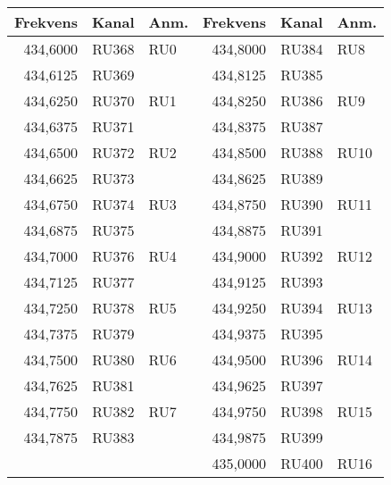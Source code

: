\clearpage
\begin{longtable}{rrl|rrl}
	Frekvens & Kanal & Anm. & Frekvens & Kanal & Anm. \\ \hline
	434,6000 & RU368 & RU0  & 434,8000 & RU384 & RU8  \\
	434,6125 & RU369 &      & 434,8125 & RU385 &  \\
	434,6250 & RU370 & RU1  & 434,8250 & RU386 & RU9  \\
	434,6375 & RU371 &      & 434,8375 & RU387 &  \\
	434,6500 & RU372 & RU2  & 434,8500 & RU388 & RU10 \\
	434,6625 & RU373 &      & 434,8625 & RU389 &  \\
	434,6750 & RU374 & RU3  & 434,8750 & RU390 & RU11 \\
	434,6875 & RU375 &      & 434,8875 & RU391 &  \\
	434,7000 & RU376 & RU4  & 434,9000 & RU392 & RU12 \\
	434,7125 & RU377 &      & 434,9125 & RU393 &  \\
	434,7250 & RU378 & RU5  & 434,9250 & RU394 & RU13 \\
	434,7375 & RU379 &      & 434,9375 & RU395 &  \\
	434,7500 & RU380 & RU6  & 434,9500 & RU396 & RU14 \\
	434,7625 & RU381 &      & 434,9625 & RU397 &  \\
	434,7750 & RU382 & RU7  & 434,9750 & RU398 & RU15 \\
	434,7875 & RU383 &      & 434,9875 & RU399 &  \\
	         &       &      & 435,0000 & RU400 & RU16
\end{longtable}

